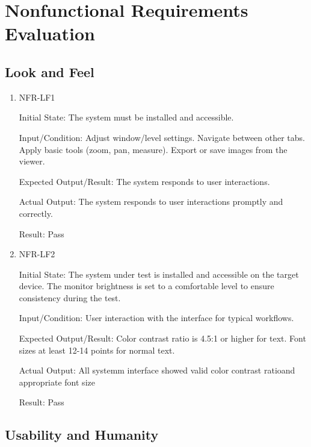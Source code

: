 \documentclass[12pt, titlepage]{article}
\begin{document}
\section{Nonfunctional Requirements Evaluation}
\subsection{Look and Feel}
\begin{enumerate}

\item{NFR-LF1\\}\label{NFR-LF1}

Initial State: The system must be installed and accessible.

Input/Condition: Adjust window/level settings. Navigate between other tabs. Apply basic tools (zoom, pan, measure). Export or save images from the viewer.

Expected Output/Result: The system responds to user interactions.

Actual Output: The system responds to user interactions promptly and correctly.

Result: Pass

\item{NFR-LF2\\}\label{NFR-LF2}

Initial State: The system under test is installed and accessible on the target device. The monitor brightness is set to a comfortable level to ensure consistency during the test.

Input/Condition: User interaction with the interface for typical workflows.

Expected Output/Result: Color contrast ratio is 4.5:1 or higher for text. Font sizes at least 12-14 points for normal text.

Actual Output: All systemm interface showed valid color contrast ratioand appropriate font size 

Result: Pass

\end{enumerate}

\subsection{Usability and Humanity}
\end{document}
